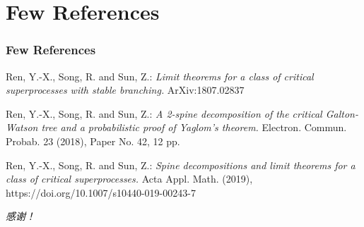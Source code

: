 \documentclass[xcolor=dvipsnames]{beamer}
\begin{document}
\section{Few References}
\begin{frame}
\frametitle<presentation>{Few References}
    
\begin{thebibliography}{10} 
    
\beamertemplatearticlebibitems

  Ren, Y.-X., Song, R. and Sun, Z.:
  \emph{Limit theorems for a class of critical superprocesses with stable branching.} ArXiv:1807.02837
  
  Ren, Y.-X., Song, R. and Sun, Z.:
  \emph{A 2-spine decomposition of the critical Galton-Watson tree and a probabilistic proof of Yaglom's theorem.}
  Electron. Commun. Probab. 23 (2018), Paper No. 42, 12 pp.
 
  Ren, Y.-X., Song, R. and Sun, Z.:
  \emph{Spine decompositions and limit theorems for a class of critical superprocesses.}
  Acta Appl. Math. (2019), https://doi.org/10.1007/s10440-019-00243-7


  \end{thebibliography}
\end{frame}
\begin{frame}
  \centering \Large
  \emph{感谢！}
\end{frame}
\end{document}
